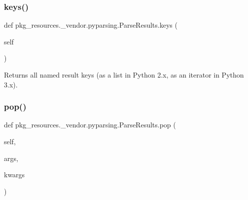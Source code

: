 \subsubsection{\texorpdfstring{keys()}{keys()}}
{\footnotesize\ttfamily def pkg\+\_\+resources.\+\_\+vendor.\+pyparsing.\+Parse\+Results.\+keys (\begin{DoxyParamCaption}\item[{}]{self }\end{DoxyParamCaption})}

\begin{DoxyVerb}Returns all named result keys (as a list in Python 2.x, as an iterator in Python 3.x).\end{DoxyVerb}
 \mbox{\label{classpkg__resources_1_1__vendor_1_1pyparsing_1_1_parse_results_acc6fbc0292ad831becc3c9506d88099f}} 
\subsubsection{\texorpdfstring{pop()}{pop()}}
{\footnotesize\ttfamily def pkg\+\_\+resources.\+\_\+vendor.\+pyparsing.\+Parse\+Results.\+pop (\begin{DoxyParamCaption}\item[{}]{self,  }\item[{}]{args,  }\item[{}]{kwargs }\end{DoxyParamCaption})}

